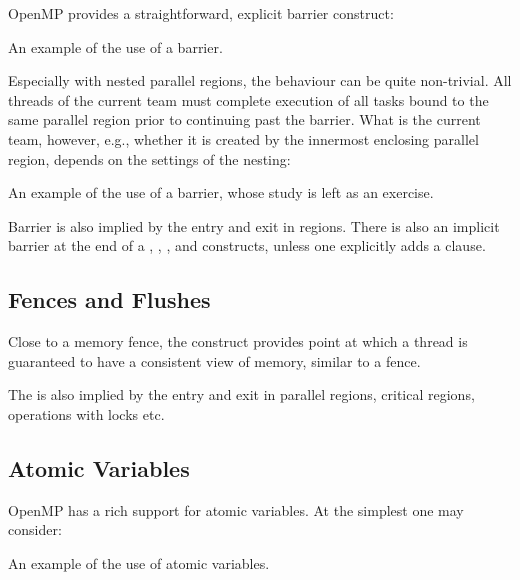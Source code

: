 OpenMP provides a straightforward, explicit barrier construct:

\raggedbottom
\begin{codebox}[]{\href{https://godbolt.org/z/qK53jYonK}{\ExternalLink}}
\footnotesize An example of the use of a barrier.
\tcblower
{}
\end{codebox}

Especially with nested parallel regions, the behaviour can be quite non-trivial.
All threads of the current team must complete execution of all tasks bound to the same parallel region prior to continuing past the barrier. What is the current team, however, e.g., whether it is created by the innermost enclosing parallel region,
depends on the settings of the nesting:

\raggedbottom
\begin{codebox}[]{\href{https://godbolt.org/z/eb7n975ea}{\ExternalLink}}
\footnotesize An example of the use of a barrier, whose study is left as an exercise.
\tcblower
{}
\end{codebox}

Barrier is also implied by the entry and exit in  regions.
There is also an implicit barrier at the end of a , , , and  constructs, unless one explicitly adds a  clause.

\subsection{Fences and Flushes}

Close to a memory fence, the  construct provides point at which a thread is guaranteed to
have a consistent view of memory, similar to a fence. 

The  is also implied by the entry and exit in parallel regions, critical regions, operations with locks etc. 

\subsection{Atomic Variables}

OpenMP has a rich support for atomic variables. 
At the simplest one may consider:

\raggedbottom
\begin{codebox}[]{\href{https://godbolt.org/z/baqqEMKEe}{\ExternalLink}}
\footnotesize An example of the use of atomic variables.
\tcblower
{}
\end{codebox}


